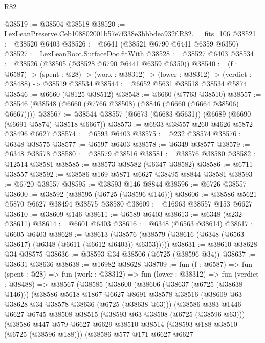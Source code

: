 \begin{lexlean}{R82}
\begin{coremodule}
@38519 := @38504 @38518
@38520 := LexLeanPreserve.Ceb108802001b57e7f338e3bbbdea932f.R82.__fits_106
@38521 := @38520 @6403
@38526 := @6641 (@38521 @6790 @6441 @6359 @6350)
@38527 := LexLeanBoot.SurfaceDoc.fitWith
@38528 := @38527 @6403
@38534 := @38526 (@38505 (@38528 @6790 @6441 @6359 @6350))
@38540 := (f : @6587) ->
  (spent : @28) -> (work : @38312) -> (lower : @38312) -> (verdict : @38488) -> @38519 @38534
@38544 := @6652 @5631 @38518 @38534 @5874
@38546 := @6660 (@8125 @38512)
@38548 := @6660 (@7763 @38510)
@38557 := @38546 (@38548 (@6660 (@7766 @38508) (@8846 (@6660 (@6664 @38506) @6667))))
@38567 := @38544 @38557 (@6673 (@6683 @5631)) (@6689 (@6690 (@6691 @5874) @38518 @6667))
@38573 := @6933 @38557 @260 @4626 @5872 @38496 @6627
@38574 := @6593 @6403
@38575 := @232 @38574
@38576 := @6348 @38575
@38577 := @6597 @6403
@38578 := @6349 @38577
@38579 := @6348 @38578
@38580 := @38579 @38516
@38581 := @38576 @38580
@38582 := @12514 @38581
@38585 := @38573 @38582 (@6347 @38582)
@38586 := @6711 @38557
@38592 := @38586 @169 @5871 @6627 @38495 @8844 @38581
@38593 := @6720 @38557
@38595 := @38593 @146 @8844
@38596 := @6726 @38557
@38600 := @38592 (@38595 (@6725 (@38596 @146)))
@38606 := @38586 @5621 @5870 @6627 @38494 @38575 @38580
@38609 := @16963 @38557 @153 @6627
@38610 := @38609 @146
@38611 := @6589 @6403
@38613 := @6348 (@232 @38611)
@38614 := @6601 @6403
@38616 := @6348 (@6563 @38614)
@38617 := @6605 @6403
@38628 := @38613
    (@38576 (@38579 (@38616 (@6348 (@6563 @38617) (@6348 (@6611 (@6612 @6403)) @6353)))))
@38631 := @38610 @38628 @34 @38575
@38636 := @38593 @34 @38506 (@6725 (@38596 @34))
@38637 := @38631 @38636
@38638 := @16982 @38628
@38709 := fun (f : @6587) =>
  fun (spent : @28) =>
  fun (work : @38312) =>
  fun (lower : @38312) =>
  fun (verdict : @38488) =>
  @38567
    (@38585
      (@38600
        (@38606
          (@38637 (@6725 (@38638 @146)))
          (@38586
            @5618
            @1867
            @6627
            @8691
            @38578
            @38516
            (@38609 @63 @38628 @34 @38578 @38636 (@6725 (@38638 @63)))
            (@38586
              @383
              @1446
              @6627
              @6745
              @38508
              @38515
              (@38593 @63 @38508 (@6725 (@38596 @63)))
              (@38586
                @447
                @579
                @6627
                @6629
                @38510
                @38514
                (@38593 @188 @38510 (@6725 (@38596 @188)))
                (@38586
                  @577
                  @171
                  @6627
                  @6627

\end{coremodule}
\end{lexlean}
